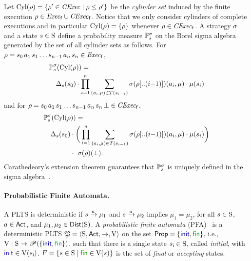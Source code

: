 Let $\Cyl(\rho)=\{\rho'\in\cexec\mid{\rho\leq\rho'}\}$ be the
\emph{cylinder set} induced by the finite execution
$\rho\in\execf\cup\cexecf$.  Notice that we only consider cylinders of
complete executions and in particular $\Cyl(\rho)=\{\rho\}$ whenever
$\rho\in\cexecf$.
%
A strategy $\strat$ and a state $s\in\S$ define a probability
measure $\Prob^\strat_s$ on the Borel sigma algebra generated by the
set of all cylinder sets as follows. 
%
For $\rho = s_0\, a_1\, s_1\ldots s_{n-1}\, a_n\, s_n \in \execf$,
%
\begin{align}
  &\Prob^\strat_s(\Cyl(\rho)) = {}\label{eq:def:prob:i}\\
  &\quad \Dirac_s(s_0)\cdot\prod\limits_{i=1}^n\sum\limits_{(a_i,\mu)\in T(s_{i-1})}\strat(\rho[..(i{-}1)])(a_i,\mu)\cdot\mu(s_i)\notag
\end{align}
%
and for
$\rho = s_0\, a_1\, s_1\ldots s_{n-1}\, a_n\, s_n\, \complete \in \cexecf$,
%
\begin{align}
  &\Prob^\strat_s(\Cyl(\rho)) = {}\label{eq:def:prob:ii}\\
  &\quad \Dirac_s(s_0)\cdot\bigg(\prod\limits_{i=1}^n\sum\limits_{(a_i,\mu)\in T(s_{i-1})}\strat(\rho[..(i{-}1)])(a_i,\mu)\cdot\mu(s_i)\bigg)\notag\\
  &\phantom{\quad \Dirac_s(s_0)} \cdot \ \strat(\rho)(\complete).\notag
\end{align}
%
Carathedeory's extension theorem guarantees that $\Prob^\strat_s$ is
uniquely defined in the sigma algebra~\cite{Segala95}.



\paragraph{Probabilistic Finite Automata.} A PLTS is deterministic
if $s\reach{a}\mu_1$ and $s\reach{a}\mu_2$
implies $\mu_1=\mu_2$,  for all $s\in\S$, $a\in\Act$, and
$\mu_1,\mu_2\in\Dist(\S)$.
%
A \emph{probabilistic finite automata} (PFA)~\cite{Rabin63,Paz71} is a
deterministic PLTS $\pfa=\tup{\S,\Act,\ra,\V}$ on the set
$\Prop=\{\init,\fin\}$, i.e., $\V:\S\to\powerset(\{\init,\fin\})$,
such that there is a single state $\sini\in\S$, called
\emph{initial}, with $\init\in\V(\sini)$.
%
$F=\{{s\in\S}\mid{\fin\in\V(s)}\}$ is the set of \emph{final} or
\emph{accepting} states.


